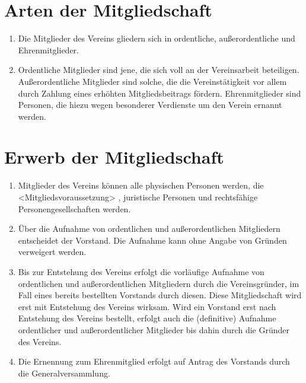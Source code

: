 \documentclass[a4paper,12pt]{article}
\begin{document}
\section{Arten der Mitgliedschaft} %
\label{sec:Mitgliedschaft-Arten}
\begin{enumerate}
\item Die Mitglieder des Vereins gliedern sich in ordentliche, außerordentliche und Ehrenmitglieder.
\item Ordentliche Mitglieder sind jene, die sich voll an der Vereinsarbeit beteiligen. Außerordentliche Mitglieder sind solche, die die Vereinstätigkeit vor allem durch Zahlung eines erhöhten Mitgliedsbeitrags fördern. Ehrenmitglieder sind Personen, die hiezu wegen besonderer Verdienste um den Verein ernannt werden.
\end{enumerate}

\section{Erwerb der Mitgliedschaft} %
\label{sec:Mitgliedschaft-Erwerb}
\begin{enumerate}
\item Mitglieder des Vereins können alle physischen Personen werden, die 
<Mitgliedsvoraussetzung> %
, juristische Personen und rechtsfähige Personengesellschaften werden.
\item  Über die Aufnahme von ordentlichen und außerordentlichen Mitgliedern entscheidet der Vorstand. Die Aufnahme kann ohne Angabe von Gründen verweigert werden.
\item Bis zur Entstehung des Vereins erfolgt die vorläufige Aufnahme von ordentlichen und außerordentlichen Mitgliedern durch die Vereinsgründer, im Fall eines bereits bestellten Vorstands durch diesen. Diese Mitgliedschaft wird erst mit Entstehung des Vereins wirksam. Wird ein Vorstand erst nach Entstehung des Vereins bestellt, erfolgt auch die (definitive) Aufnahme ordentlicher und außerordentlicher Mitglieder bis dahin durch die Gründer des Vereins. 
\item Die Ernennung zum Ehrenmitglied erfolgt auf Antrag des Vorstands durch die Generalversammlung.
\end{enumerate}
\end{document}
